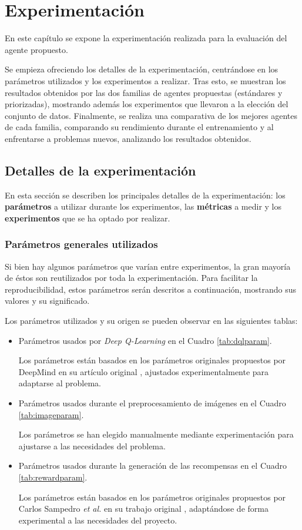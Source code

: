 \chapter{Experimentación}

En este capítulo se expone la experimentación realizada para la evaluación del agente propuesto.

Se empieza ofreciendo los detalles de la experimentación, centrándose en los parámetros utilizados y los experimentos a realizar. Tras esto, se muestran los resultados obtenidos por las dos familias de agentes propuestas (estándares y priorizadas), mostrando además los experimentos que llevaron a la elección del conjunto de datos. Finalmente, se realiza una comparativa de los mejores agentes de cada familia, comparando su rendimiento durante el entrenamiento y al enfrentarse a problemas nuevos, analizando los resultados obtenidos.

\section{Detalles de la experimentación}

En esta sección se describen los principales detalles de la experimentación: los \textbf{parámetros} a utilizar durante los experimentos, las \textbf{métricas} a medir y los \textbf{experimentos} que se ha optado por realizar.

\subsection{Parámetros generales utilizados}

Si bien hay algunos parámetros que varían entre experimentos, la gran mayoría de éstos son reutilizados por toda la experimentación. Para facilitar la reproducibilidad, estos parámetros serán descritos a continuación, mostrando sus valores y su significado.

Los parámetros utilizados y su origen se pueden observar en las siguientes tablas:
\begin{itemize}
	\item Parámetros usados por \textit{Deep Q-Learning} en el Cuadro \ref{tab:dqlparam}.
	
	Los parámetros están basados en los parámetros originales propuestos por DeepMind en su artículo original \cite{Mnih2015HumanlevelCT}, ajustados experimentalmente para adaptarse al problema.
	
	\item Parámetros usados durante el preprocesamiento de imágenes en el Cuadro \ref{tab:imageparam}.
	
	Los parámetros se han elegido manualmente mediante experimentación para ajustarse a las necesidades del problema.
	
	\item Parámetros usados durante la generación de las recompensas en el Cuadro \ref{tab:rewardparam}.
	
	Los parámetros están basados en los parámetros originales propuestos por Carlos Sampedro \textit{et al.} en su trabajo original \cite{Sampedro2018}, adaptándose de forma experimental a las necesidades del proyecto.
\end{itemize}

